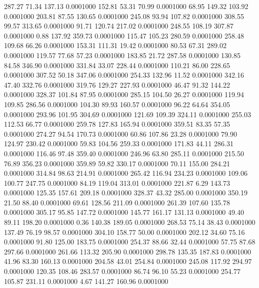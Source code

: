  287.27   71.34  137.13   0.0001000
 152.81   53.31   70.99   0.0001000
  68.95  149.32  103.92   0.0001000
 203.81   87.55  130.65   0.0001000
 245.08   93.94  107.82   0.0001000
 308.55   99.57  313.65   0.0001000
  91.71  120.74  217.02   0.0001000
 248.55  108.19  307.87   0.0001000
   0.88  137.92  359.73   0.0001000
 115.47  105.23  280.59   0.0001000
 258.48  109.68   66.26   0.0001000
 153.31  111.31   19.42   0.0001000
  80.53   67.31  289.02   0.0001000
 119.57   77.68   57.23   0.0001000
 183.85   21.72  287.58   0.0001000
 130.85   84.58  346.90   0.0001000
 331.84   33.07  228.44   0.0001000
 110.21   86.00  228.65   0.0001000
 307.52   50.18  347.06   0.0001000
 254.33  132.96   11.52   0.0001000
 342.16   47.40  332.76   0.0001000
 319.76  129.27  227.93   0.0001000
  46.47   91.32  144.22   0.0001000
 328.37  101.84   87.95   0.0001000
 285.15  104.50   26.27   0.0001000
 119.94  109.85  286.56   0.0001000
 104.30   89.93  160.57   0.0001000
  96.22   64.64  354.05   0.0001000
 293.96  101.95  304.69   0.0001000
 121.69  109.39  324.11   0.0001000
 255.03  112.53   66.77   0.0001000
 259.78  127.83  165.94   0.0001000
 359.51   83.35   57.35   0.0001000
 274.27   94.54  170.73   0.0001000
  60.86  107.86   23.28   0.0001000
  79.90  124.97  230.42   0.0001000
  59.83  104.56  259.33   0.0001000
 171.83   44.11  286.31   0.0001000
 116.46   97.48  359.40   0.0001000
 246.96   63.80  285.11   0.0001000
 215.50   76.89  356.23   0.0001000
 359.89   59.82  330.17   0.0001000
  70.11  155.00  284.21   0.0001000
 314.84   98.63  214.91   0.0001000
 265.42  116.94  234.23   0.0001000
 109.06  100.77  247.75   0.0001000
  84.19  119.04  313.01   0.0001000
 221.87    6.29  143.73   0.0001000
 125.35  157.61  209.18   0.0001000
 328.37   43.32  285.00   0.0001000
 350.19   21.50   88.40   0.0001000
  69.61  128.56  211.09   0.0001000
 261.39  107.60  135.78   0.0001000
 305.17   95.85  147.72   0.0001000
 145.77  161.17  131.13   0.0001000
  49.40   89.11  198.20   0.0001000
   0.36  140.38  189.05   0.0001000
 268.53   75.14   38.43   0.0001000
 137.49   76.19   98.57   0.0001000
 304.10  158.77   50.00   0.0001000
 202.12   34.60   75.16   0.0001000
  91.80  125.00  183.75   0.0001000
 254.37   88.66   32.44   0.0001000
  57.75   87.68  297.66   0.0001000
 261.66  113.32  205.90   0.0001000
 298.78  135.35  187.83   0.0001000
  41.96   83.30  160.13   0.0001000
 204.58   43.01  254.84   0.0001000
 245.08  117.92  294.97   0.0001000
 120.35  108.46  283.57   0.0001000
  86.74   96.10   55.23   0.0001000
 254.77  105.87  231.11   0.0001000
   4.67  141.27  160.96   0.0001000
